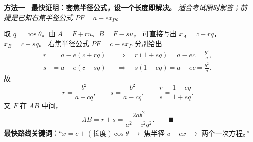 \clearpage
\begin{proofbox}
\textbf{方法一｜最快证明：套焦半径公式，设一个长度即解决。}\quad
\emph{适合考试限时解答；前提是已知右焦半径公式 $PF=a-ex_P$。}
\par\smallskip\noindent
取 $q=\cos\theta$。由 $A=F+ru$、$B=F-su$，
可直接写出 $x_A=c+rq$，$x_B=c-sq$。
右焦半径公式 $PF=a-ex_P$ 分别给出
\[
 \begin{aligned}
 r&=a-e(c+rq)
 &&\Longrightarrow\quad r(1+eq)=a-ec=\frac{b^2}{a},\\
 s&=a-e(c-sq)
 &&\Longrightarrow\quad s(1-eq)=a-ec=\frac{b^2}{a}.
 \end{aligned}
\]
故
\[
 \boxed{r=\frac{b^2}{a+cq},\qquad
 s=\frac{b^2}{a-cq}},\qquad
 \boxed{\frac rs=\frac{1-eq}{1+eq}}.
\]
又 $F$ 在 $AB$ 中间，
\[
 \boxed{AB=r+s=\frac{2ab^2}{a^2-c^2q^2}}.\qquad\blacksquare
\]
\textbf{最快路线关键词：}``$x=c\pm(\text{长度})\cos\theta$
$\to$ 焦半径 $a-ex$ $\to$ 两个一次方程。''
\end{proofbox}

